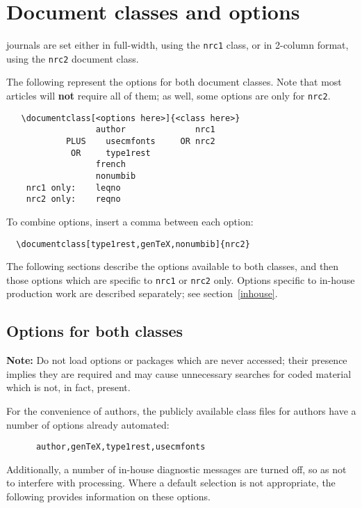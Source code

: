 \section{Document classes and options}

\NRC{} journals are set either in full-width, using the \texttt{nrc1}
class, or in 2-column format, using the \texttt{nrc2} document class.

The following represent the options for both document classes. Note
that most articles will {\bf not} require all of them; as well, some
options are only for \texttt{nrc2}.

\begin{verbatim}
   \documentclass[<options here>]{<class here>}
                  author              nrc1
            PLUS    usecmfonts     OR nrc2
             OR     type1rest       
                  french           
                  nonumbib
    nrc1 only:    leqno
    nrc2 only:    reqno

\end{verbatim}

\newpage

\noindent To combine options, insert a comma between each option:

\begin{verbatim}
  \documentclass[type1rest,genTeX,nonumbib]{nrc2}
\end{verbatim}

The following sections describe the options available to both classes,
and then those options which are specific to \texttt{nrc1} or
\texttt{nrc2} only. Options specific to in-house production work are
described separately; see section~\ref{inhouse}.


\subsection{Options for both classes}

{\bf Note:} Do not load options or packages which are never accessed;
their presence implies they are required and may cause unnecessary
searches for coded material which is not, in fact, present.

For the convenience of authors, the publicly available class files for
authors have a number of options already automated:
%
   \begin{verbatim}
      author,genTeX,type1rest,usecmfonts
   \end{verbatim}
%
Additionally, a number of in-house diagnostic messages are turned off,
so as not to interfere with processing. Where a default selection is
not appropriate, the following provides information on these options.


